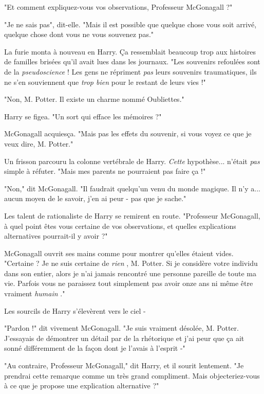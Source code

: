 "Et comment expliquez-vous vos observations, Professeur McGonagall ?"

"Je ne sais pas", dit-elle. "Mais il est possible que quelque chose vous soit arrivé, quelque chose dont vous ne vous souvenez pas."

La furie monta à nouveau en Harry. Ça ressemblait beaucoup trop aux histoires de familles brisées qu'il avait lues dans les journaux. "Les souvenirs refoulées sont de la \emph{pseudoscience}  ! Les gens ne répriment \emph{pas}  leurs souvenirs traumatiques, ils ne s'en souviennent que \emph{trop bien}  pour le restant de leurs vies !"

"Non, M. Potter. Il existe un charme nommé Oubliettes."

Harry se figea. "Un sort qui efface les mémoires ?"

McGonagall acquiesça. "Mais pas les effets du souvenir, si vous voyez ce que je veux dire, M. Potter."

Un frisson parcouru la colonne vertébrale de Harry. \emph{Cette}  hypothèse... n'était \emph{pas}  simple à réfuter. "Mais mes parents ne pourraient pas faire ça !"

"Non," dit McGonagall. "Il faudrait quelqu'un venu du monde magique. Il n'y a... aucun moyen de le savoir, j'en ai peur - pas que je sache."

Les talent de rationaliste de Harry se remirent en route. "Professeur McGonagall, à quel point êtes vous certaine de vos observations, et quelles explications alternatives pourrait-il y avoir ?"

McGonagall ouvrit ses mains comme pour montrer qu'elles étaient vides. "Certaine ? Je ne suis certaine de \emph{rien} , M. Potter. Si je considère votre individu dans son entier, alors je n'ai jamais rencontré une personne pareille de toute ma vie. Parfois vous ne paraissez tout simplement pas avoir onze ans ni même être vraiment \emph{humain} ."

Les sourcils de Harry s'élevèrent vers le ciel -

"Pardon !" dit vivement McGonagall. "Je suis vraiment désolée, M. Potter. J'essayais de démontrer un détail par de la rhétorique et j'ai peur que ça ait sonné différemment de la façon dont je l'avais à l'esprit -"

"Au contraire, Professeur McGonagall," dit Harry, et il sourit lentement. "Je prendrai cette remarque comme un très grand compliment. Mais objecteriez-vous à ce que je propose une explication alternative ?"

